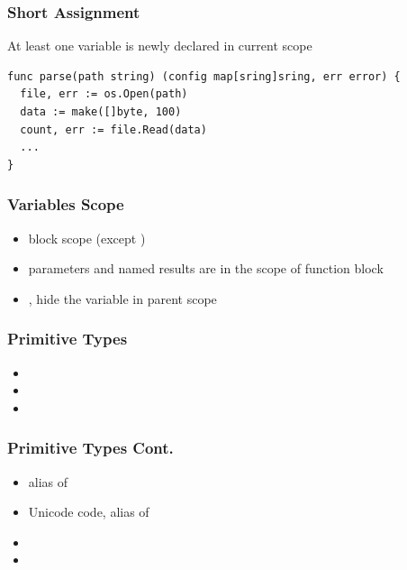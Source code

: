 \documentclass[xetex,mathserif,serif,12pt]{beamer}
\begin{document}
\begin{frame}[fragile]
  \frametitle{Short Assignment}

  At least one variable is newly declared in current scope

  \begin{beamer@nomargin}
    \begin{lstlisting}
func parse(path string) (config map[sring]sring, err error) {
  file, err := os.Open(path)
  data := make([]byte, 100)
  count, err := file.Read(data)
  ...
}
    \end{lstlisting}
  \end{beamer@nomargin}
\end{frame}


\begin{frame}
  \frametitle{Variables Scope}

  \begin{itemize}
  \item block scope (except )
  \item parameters and named results are in the scope of function block
  \item {}, \hltexttt{:=} hide the variable in parent scope
  \end{itemize}
\end{frame}

\begin{frame}

  \frametitle{Primitive Types}

  \begin{itemize}
  \item {}
  \item {}
  \item
            \newline
        \newline
  \end{itemize}

\end{frame}

\begin{frame}

  \frametitle{Primitive Types Cont.}

  \begin{itemize}
  \item {} alias of 
  \item {} Unicode code, alias of 
  \item {} 
  \item {} 
  \end{itemize}
\end{frame}
\end{document}
